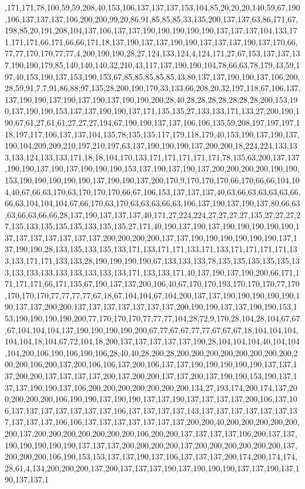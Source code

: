 ,171,171,78,100,59,59,208,40,153,106,137,137,137,153,104,85,20,20,20,140,59,67,190,106,137,137,137,106,200,200,99,20,86,91,85,85,85,33,135,200,137,137,63,86,171,67,198,85,20,191,208,104,137,106,137,137,190,190,190,190,190,137,137,137,104,133,171,171,171,66,171,66,66,171,18,137,190,137,137,190,190,137,137,137,190,137,170,66,77,77,170,170,77,77,4,200,190,190,28,27,124,133,124,4,124,171,27,67,153,137,137,137,190,190,179,85,140,140,140,32,210,43,117,137,190,190,104,78,66,63,78,179,43,59,197,40,153,190,137,153,190,153,67,85,85,85,85,85,43,80,137,137,190,190,137,106,200,28,59,91,7,7,91,86,88,97,135,28,200,190,170,33,133,66,208,20,32,197,118,67,106,137,137,190,190,137,190,137,190,137,190,190,200,28,40,28,28,28,28,28,28,28,200,153,190,137,190,190,153,137,137,190,190,137,171,135,135,27,133,133,171,133,27,200,190,190,67,61,27,61,61,27,27,27,194,67,190,190,137,137,106,106,135,59,208,197,197,197,118,197,117,106,137,137,104,135,78,135,135,117,179,118,179,40,153,190,137,190,137,190,104,209,209,210,197,210,197,63,137,190,190,190,137,200,200,18,224,224,133,133,133,124,133,133,171,18,18,104,170,133,171,171,171,171,171,78,135,63,200,137,137,190,190,137,190,137,190,190,190,153,137,190,137,190,137,200,200,200,200,190,190,153,190,190,190,190,190,137,190,190,137,200,170,9,170,170,170,66,170,66,66,104,104,40,67,66,63,170,63,170,170,170,66,67,106,153,137,137,137,40,63,66,63,63,63,63,66,66,63,104,104,104,67,66,170,63,170,63,63,63,66,63,106,137,190,137,190,137,80,66,63,63,66,63,66,66,28,137,190,137,137,137,40,171,27,224,224,27,27,27,27,135,27,27,27,27,135,133,135,135,135,133,135,135,27,171,40,190,137,190,137,190,190,190,190,190,137,137,137,137,137,137,137,200,200,200,200,137,137,190,190,190,190,190,190,137,137,190,190,28,133,135,133,135,133,171,133,171,171,133,171,133,171,171,171,171,133,133,171,171,133,133,28,190,190,190,190,67,133,133,133,78,135,135,135,135,135,133,133,133,133,133,133,133,133,133,171,133,133,171,40,137,190,137,190,200,66,171,171,171,171,66,171,135,67,190,137,137,200,106,40,67,170,170,193,170,170,170,77,170,170,170,170,77,77,77,77,67,18,67,104,104,67,104,200,137,137,190,190,190,190,190,190,137,137,200,200,137,137,137,137,137,137,137,200,190,190,137,137,190,190,153,153,190,190,190,190,200,77,170,170,170,77,77,77,104,28,72,9,170,28,104,28,104,67,67,67,104,104,104,137,190,190,190,190,200,67,77,67,67,77,77,67,67,67,18,104,104,104,104,104,18,104,67,72,104,18,200,137,137,137,137,137,190,28,104,104,104,40,104,104,104,200,106,190,106,190,106,28,40,40,28,200,28,200,200,200,200,200,200,200,200,200,200,106,200,137,200,106,106,137,200,106,137,137,190,190,190,190,190,137,137,137,200,200,137,137,137,137,200,137,200,200,137,137,200,137,190,190,153,190,137,137,137,190,190,137,106,200,200,200,200,200,200,200,134,27,193,174,200,174,137,200,200,200,200,106,190,190,137,190,190,137,137,190,137,137,137,137,200,106,137,106,137,137,137,137,137,137,137,106,137,137,137,137,143,137,137,137,137,137,137,137,137,137,137,106,106,137,137,137,137,137,137,137,200,200,40,200,200,200,200,200,200,137,200,200,200,200,200,200,200,106,200,200,137,137,137,137,106,200,137,137,190,190,190,190,190,137,137,137,200,200,200,200,137,200,200,200,200,200,200,137,200,200,200,106,190,153,153,137,137,190,137,106,137,137,137,200,174,200,174,174,28,61,4,134,200,200,200,137,200,137,137,137,190,137,190,190,190,137,137,190,137,190,137,137,1